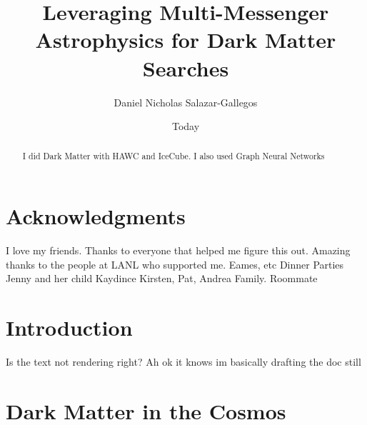 \documentclass[PhD]{msu-thesis}
\title{Leveraging Multi-Messenger Astrophysics for Dark Matter Searches}
\author{Daniel Nicholas Salazar-Gallegos}
\date{Today}
\begin{document}
\frontmatter
\maketitlepage

\begin{abstract}
    I did Dark Matter with HAWC and IceCube. I also used Graph Neural Networks
\end{abstract}

\clearpage

\makecopyrightpage

\clearpage

\chapter*{Acknowledgments}
\DoubleSpacing
I love my friends.
Thanks to everyone that helped me figure this out.
Amazing thanks to the people at LANL who supported me.
Eames, etc
Dinner Parties
Jenny and her child Kaydince
Kirsten, Pat, Andrea
Family.
Roommate

\clearpage

\SingleSpacing

\tableofcontents*
\clearpage

\listoftables

\clearpage

\listoffigures


\begin{abbreviations}
\end{abbreviations}

\mainmatter

\chapter{Introduction\label{sec:intro}}
Is the text not rendering right? Ah ok it knows im basically drafting the doc still

\chapter{Dark Matter in the Cosmos\label{sec:dm_cosmos}}

\end{document}
